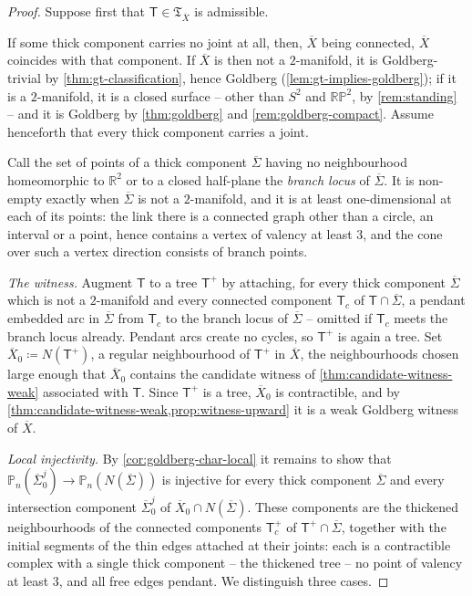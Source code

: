 \documentclass[reqno]{amsart}
\theoremstyle{definition}
\newcommand\sfT{\mathsf{T}}
\newcommand{\PB}{\mathbb{P}}
\newcommand{\R}{\mathbb{R}}
\newcommand{\RP}{\mathbb{RP}}
\renewcommand{\bar}{\overline}
\numberwithin{equation}{section}
\begin{document}
\begin{proof}
Suppose first that \(\sfT\in\mathfrak{T}_{\bar X}\) is admissible.

If some thick component carries no joint at all, then, \(\bar X\)
being connected, \(\bar X\) coincides with that component. If
\(\bar X\) is then not a \(2\)-manifold, it is Goldberg-trivial
by \cref{thm:gt-classification}, hence Goldberg
(\cref{lem:gt-implies-goldberg}); if it is a \(2\)-manifold, it is a
closed surface -- other than \(S^2\) and \(\RP^2\), by
\cref{rem:standing} -- and it is Goldberg by
\cref{thm:goldberg} and \cref{rem:goldberg-compact}.
Assume henceforth that every thick component carries a joint.

Call the set of points of a thick component \(\bar\Sigma\)
having no neighbourhood homeomorphic to \(\R^2\) or to a closed
half-plane the \emph{branch locus} of \(\bar\Sigma\). It is
non-empty exactly when \(\bar\Sigma\) is not a \(2\)-manifold,
and it is at least one-dimensional at each of its points: the
link there is a connected graph other than a circle, an
interval or a point, hence contains a vertex of valency at
least \(3\), and the cone over such a vertex direction consists
of branch points.

\emph{The witness.} Augment \(\sfT\) to a tree \(\sfT^+\) by
attaching, for every thick component \(\bar\Sigma\) which is
not a \(2\)-manifold and every connected component \(\sfT_c\) of
\(\sfT\cap\bar\Sigma\), a pendant embedded arc in \(\bar\Sigma\)
from \(\sfT_c\) to the branch locus of \(\bar\Sigma\) -- omitted
if \(\sfT_c\) meets the branch locus already. Pendant arcs create
no cycles, so \(\sfT^+\) is again a tree. Set
\(\bar X_0\coloneqq N(\sfT^+)\), a regular neighbourhood of
\(\sfT^+\) in \(\bar X\), the neighbourhoods chosen large enough
that \(\bar X_0\) contains the candidate witness of
\cref{thm:candidate-witness-weak} associated with \(\sfT\). Since
\(\sfT^+\) is a tree, \(\bar X_0\) is contractible, and by
\cref{thm:candidate-witness-weak,prop:witness-upward} it is a
weak Goldberg witness of \(\bar X\).

\emph{Local injectivity.} By \cref{cor:goldberg-char-local} it
remains to show that
\(\PB_n(\bar\Sigma_0^j)\to\PB_n(N(\bar\Sigma))\) is injective
for every thick component \(\bar\Sigma\) and every intersection
component \(\bar\Sigma_0^j\) of \(\bar X_0\cap N(\bar\Sigma)\).
These components are the thickened neighbourhoods of the
connected components \(\sfT^+_c\) of \(\sfT^+\cap\bar\Sigma\),
together with the initial segments of the thin edges attached
at their joints: each is a contractible complex with a single
thick component -- the thickened tree -- no point of valency at
least \(3\), and all free edges pendant. We distinguish three
cases.


\end{proof}
\end{document}
